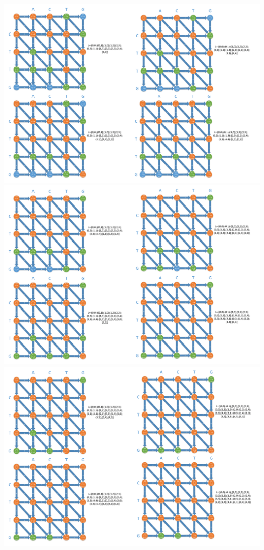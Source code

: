 \documentclass[5pt,a4paper]{report}
\begin{document}
	\includegraphics[scale=0.08]{Q23-4}\\
	\includegraphics[scale=0.08]{Q23-5}\\
	\includegraphics[scale=0.08]{Q23-6}\\
\end{document}
